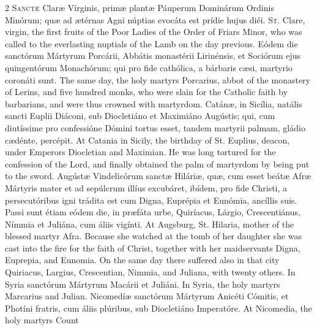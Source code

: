 \begin{paracol}{2}
\lettrine[lines=2]{S}{anctæ} Claræ Vírginis, 
 primæ plantæ Páuperum Dominárum Ordinis Minórum; quæ ad ætérnas Agni núptias 
 evocáta est prídie hujus diéi.
\switchcolumn
{}
\lettrine[lines=2]{S}{t.} Clare, virgin, the first fruits 
 of the Poor Ladies of the Order of Friars Minor, who was called to the 
 everlasting nuptials of the Lamb on the day previous.
\switchcolumn*
{}
Eódem die sanctórum 
 Mártyrum Porcárii, Abbátis monastérii Lirinénsis, et Sociórum ejus 
 quingentórum Monachórum; qui pro fide cathólica, a bárbaris cæsi, martyrio 
 coronáti sunt.
\switchcolumn
{}
The same day, the holy martyrs 
 Porcarius, abbot of the monastery of Lerins, and five hundred monks, who 
 were slain for the Catholic faith by barbarians, and were thus crowned with 
 martyrdom.
\switchcolumn*
{}
Catánæ, in Sicília, 
 natális sancti Euplii Diáconi, sub Diocletiáno et Maximiáno Augústis; qui, 
 cum diutíssime pro confessióne Dómini tortus esset, tandem martyrii palmam, 
 gládio cædénte, percépit.
\switchcolumn
{}
At Catania in Sicily, the birthday 
 of St. Euplius, deacon, under Emperors Diocletian and Maximian. He was 
 long tortured for the confession of the Lord, and finally obtained the palm 
 of martyrdom by being put to the sword.
\switchcolumn*
{}
Augústæ Vindelicórum 
 sanctæ Hiláriæ, quæ, cum esset beátæ Afræ Mártyris mater et ad sepúlcrum illíus excubáret, ibídem, pro fide Christi, a persecutóribus igni trádita 
 est cum Digna, Euprépia et Eunómia, ancíllis suis. Passi sunt étiam 
 eódem die, in præfáta urbe, Quiríacus, Lárgio, Crescentiánus, Nímmia et 
 Juliána, cum áliis vigínti.
\switchcolumn
{}
At Augsburg, St. Hilaria, mother of 
 the blessed martyr Afra. Because she watched at the tomb of her 
 daughter she was cast into the fire for the faith of Christ, together with 
 her maidservants Digna, Euprepia, and Eunomia. On the same day there 
 suffered also in that city Quiriacus, Largius, Crescentian, Nimmia, and 
 Juliana, with twenty others.
\switchcolumn*
{}
In Syria sanctórum 
 Mártyrum Macárii et Juliáni.
\switchcolumn
{}
In Syria, the holy martyrs Marcarius 
 and Julian.
\switchcolumn*
{}
Nicomedíæ sanctórum 
 Mártyrum Anicéti Cómitis, et Photíni fratris, cum áliis plúribus, sub 
 Diocletiáno Imperatóre.
\switchcolumn
{}
At Nicomedia, the holy martyrs Count 

\end{paracol}
